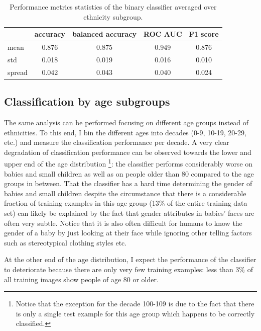 \documentclass{article}
\begin{document}
\begin{table}[h!]
\begin{center}
\caption{Performance metrics statistics of the binary classifier averaged over ethnicity subgroup.}
\label{tab:ethnicitystats}
\begin{tabular}{| l | c | c | c | c |}
\hline\hline
& accuracy & balanced accuracy & ROC AUC & F1 score\\
\hline\hline
mean & 0.876 & 0.875 & 0.949 & 0.876 \\
std & 0.018 & 0.019 & 0.016 & 0.010 \\
spread & 0.042 & 0.043 & 0.040 & 0.024 \\
\hline\hline
\end{tabular}
\end{center}
\end{table}
\FloatBarrier

\subsection{Classification by age subgroups}
The same analysis can be performed focusing on different age groups instead of ethnicities. To this end, I bin the different ages into decades (0-9, 10-19, 20-29, etc.) and measure the classification performance per decade. A very clear degradation of classification performance can be observed towards the lower and upper end of the age distribution \footnote{Notice that the exception for the decade 100-109 is due to the fact that there is only a single test example for this age group which happens to be correctly classified.}: the classifier performs considerably worse on babies and small children as well as on people older than 80 compared to the age groups in between. That the classifier has a hard time determining the gender of babies and small children despite the circumstance that there is a considerable fraction of training examples in this age group (13\% of the entire training data set) can likely be explained by the fact that gender attributes in babies' faces are often very subtle. Notice that it is also often difficult for humans to know the gender of a baby by just looking at their face while ignoring other telling factors such as stereotypical clothing styles etc.

At the other end of the age distribution, I expect the performance of the classifier to deteriorate because there are only very few training examples: less than 3\% of all training images show people of age 80 or older.
\end{document}

